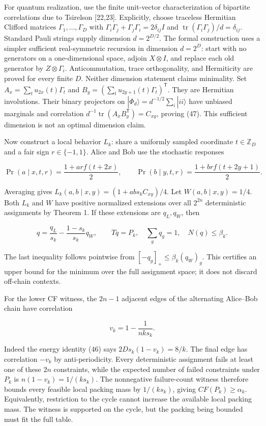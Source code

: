 \documentclass[
]{article}
\begin{document}
For quantum realization, use the finite unit-vector characterization of
bipartite correlations due to Tsirelson {[}22,23{]}. Explicitly, choose traceless
Hermitian Clifford matrices \(\Gamma_1,\ldots,\Gamma_D\) with
\(\Gamma_i\Gamma_j+\Gamma_j\Gamma_i=2\delta_{ij}I\) and
\(\operatorname{tr}(\Gamma_i\Gamma_j)/d=\delta_{ij}\).
Standard Pauli strings supply dimension \(d=2^{D/2}\). The formal construction uses a simpler sufficient real-symmetric recursion in dimension \(d=2^D\): start with no generators on a one-dimensional space, adjoin \(X\otimes I\), and replace each old generator by \(Z\otimes\Gamma_i\). Anticommutation, trace orthogonality, and Hermiticity are proved for every finite \(D\). Neither dimension statement claims minimality. Set
\(A_x=\sum_tu_{2x}(t)\Gamma_t\) and
\(B_y=(\sum_tu_{2y+1}(t)\Gamma_t)^\mathsf T\).
They are Hermitian involutions. Their binary projectors on
\(|\Phi_d\rangle=d^{-1/2}\sum_i|ii\rangle\) have unbiased marginals and
correlation \(d^{-1}\operatorname{tr}(A_xB_y^\mathsf T)=C_{xy}\),
proving (47). This sufficient dimension is not an optimal dimension claim.

Now construct a local behavior \(L_k\): share a uniformly sampled coordinate
\(t\in\mathbb Z_D\) and a fair sign \(r\in\{-1,1\}\). Alice and Bob use the
stochastic responses

\[
\Pr(a\mid x,t,r)=\frac{1+ar f(t+2x)}2,\qquad
\Pr(b\mid y,t,r)=\frac{1+br f(t+2y+1)}2.
\]

Averaging gives \(L_k(a,b\mid x,y)=(1+ab s_k C_{xy})/4\).
Let \(W(a,b\mid x,y)=1/4\). Both \(L_k\) and \(W\) have positive normalized
extensions over all \(2^{2n}\) deterministic assignments by Theorem 1.
If these extensions are \(q_L,q_W\), then

\[
q=\frac{q_L}{s_k}-\frac{1-s_k}{s_k}q_W,
\qquad Tq=P_k,\quad \sum_gq_g=1,\quad N(q)\le\beta_k.
\tag{48}
\]

The last inequality follows pointwise from
\([-q_g]_+\le\beta_k(q_W)_g\). This certifies an upper bound for the minimum
over the full assignment space; it does not discard off-chain contexts.

For the lower CF witness, the \(2n-1\) adjacent edges of the alternating
Alice--Bob chain have correlation

\[
v_k=1-\frac{1}{nk s_k}.
\]

Indeed the energy identity (46) says
\(2Ds_k(1-v_k)=8/k\). The final edge has correlation \(-v_k\) by
anti-periodicity. Every deterministic assignment fails at least one of
these \(2n\) constraints, while the expected number of failed constraints
under \(P_k\) is \(n(1-v_k)=1/(ks_k)\). The nonnegative failure-count witness
therefore bounds every feasible local packing mass by \(1/(ks_k)\),
giving \(CF(P_k)\ge\alpha_k\). Equivalently, restriction to the cycle
cannot increase the available local packing mass. The witness is supported
on the cycle, but the packing being bounded must fit the full table.
\end{document}
